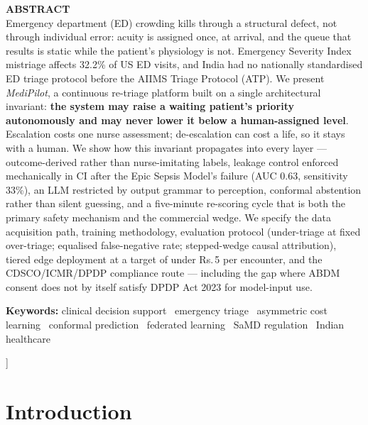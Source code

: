 \documentclass[10pt,a4paper,twocolumn]{article}
\begin{document}
{\vspace{7pt}
\begin{tcolorbox}[mpbox,colback=White,leftrule=0pt,left=0pt,right=0pt,top=2pt,bottom=2pt]
{\sffamily\scriptsize\bfseries\color{AccPurple}ABSTRACT}\\[2pt]
\footnotesize
Emergency department (ED) crowding kills through a structural defect, not through
individual error: acuity is assigned once, at arrival, and the queue that results is
static while the patient's physiology is not. Emergency Severity Index mistriage
affects 32.2\% of US ED visits, and India had no nationally standardised ED triage
protocol before the AIIMS Triage Protocol (ATP). We present \emph{MediPilot}, a
continuous re-triage platform built on a single architectural invariant:
\textbf{the system may raise a waiting patient's priority autonomously and may never
lower it below a human-assigned level}. Escalation costs one nurse assessment;
de-escalation can cost a life, so it stays with a human. We show how this invariant
propagates into every layer --- outcome-derived rather than nurse-imitating labels,
leakage control enforced mechanically in CI after the Epic Sepsis Model's failure
(AUC 0.63, sensitivity 33\%), an LLM restricted by output grammar to perception,
conformal abstention rather than silent guessing, and a five-minute re-scoring cycle
that is both the primary safety mechanism and the commercial wedge. We specify the
data acquisition path, training methodology, evaluation protocol
(under-triage at fixed over-triage; equalised false-negative rate; stepped-wedge
causal attribution), tiered edge deployment at a target of under Rs.\,5 per
encounter, and the CDSCO/ICMR/DPDP compliance route --- including the gap where
ABDM consent does not by itself satisfy DPDP Act 2023 for model-input use.

\vspace{3pt}
{\sffamily\scriptsize\color{MedGray}\textbf{\color{NearBlack}Keywords:}\;
clinical decision support \textbullet\ emergency triage \textbullet\ asymmetric cost
learning \textbullet\ conformal prediction \textbullet\ federated learning
\textbullet\ SaMD regulation \textbullet\ Indian healthcare}
\end{tcolorbox}
\vspace{4pt}
}]

\section{Introduction}
\end{document}
